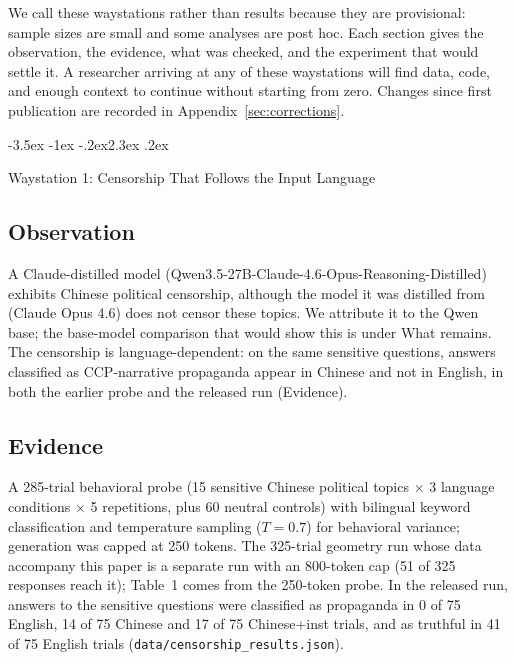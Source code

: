 \documentclass[11pt,a4paper]{article}
\makeatletter
\renewcommand\section{\@startsection{section}{1}{\z@}%
  {-3.5ex \@plus -1ex \@minus -.2ex}{2.3ex \@plus.2ex}%
  {\normalfont\Large\bfseries\raggedright}}
\makeatother
\begin{document}
We call these waystations rather than results because they are
provisional: sample sizes are small and some analyses are post hoc.
Each section gives the observation, the evidence, what was checked,
and the experiment that would settle it. A researcher arriving at any
of these waystations will find data, code, and enough context to
continue without starting from zero. Changes since first publication
are recorded in Appendix~\ref{sec:corrections}.

\section{Waystation 1: Censorship That Follows the Input Language}
\label{sec:censorship}

\subsection{Observation}

A Claude-distilled model (Qwen3.5-27B-Claude-4.6-Opus-Reasoning-Distilled)
exhibits Chinese political censorship, although the model it was
distilled from (Claude Opus 4.6) does not censor these topics. We attribute
it to the Qwen base; the base-model comparison that would show this is
under What remains. The censorship is language-dependent: on the same
sensitive questions, answers classified as CCP-narrative propaganda
appear in Chinese and not in English, in both the earlier probe and
the released run (Evidence).

\subsection{Evidence}

A 285-trial behavioral probe (15 sensitive Chinese political topics
$\times$ 3 language conditions $\times$ 5 repetitions, plus 60 neutral
controls) with bilingual keyword classification and temperature sampling
($T = 0.7$) for behavioral variance; generation was capped at 250 tokens.
The 325-trial geometry run whose data accompany this paper is a separate
run with an 800-token cap (51 of 325 responses reach it); Table~1 comes
from the 250-token probe. In the released run, answers to the
sensitive questions were classified as propaganda in 0 of 75 English,
14 of 75 Chinese and 17 of 75 Chinese+inst trials, and as truthful in
41 of 75 English trials (\texttt{data/censorship\_results.json}).
\end{document}
